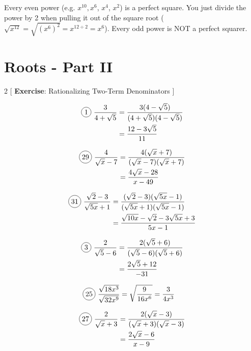 Every even power (e.g. $x^{10}, $$x^{6}$, $x^{4}$, $x^{2}$) is a perfect square. You just divide the power by 2 when pulling it out of the square root ($\sqrt{x^{12}}=\sqrt{(x^{6})^{2}}=x^{12\div 2}=x^{6}$). Every odd power is NOT a perfect squarer.

\section{Roots - Part II}

\begin{multicols}{2}
[
  \textbf{Exercise}: Rationalizing Two-Term Denominators
]

\begin{align*}
  \circled{1}\ \frac{3}{4+\sqrt{5}}&=\frac{3(4-\sqrt{5})}{(4+\sqrt{5})(4-\sqrt{5})}\\
  &=\frac{12-3\sqrt{5}}{11}
\end{align*}

\begin{align*}
  \circled{29}\ \frac{4}{\sqrt{x}-7}&=\frac{4(\sqrt{x}+7)}{(\sqrt{x}-7)(\sqrt{x}+7)}\\
  &=\frac{4\sqrt{x}-28}{x-49}
\end{align*}

\begin{align*}
  \circled{31}\ \frac{\sqrt{2}-3}{\sqrt{5x}+1}&=\frac{(\sqrt{2}-3)(\sqrt{5x}-1)}{(\sqrt{5x}+1)(\sqrt{5x}-1)}\\
  &=\frac{\sqrt{10x}-\sqrt{2}-3\sqrt{5x}+3}{5x-1}
\end{align*}

\begin{align*}
  \circled{3}\ \frac{2}{\sqrt{5}-6}&=\frac{2(\sqrt{5}+6)}{(\sqrt{5}-6)(\sqrt{5}+6)}\\
  &=\frac{2\sqrt{5}+12}{-31}
\end{align*}

\begin{align*}
  \circled{25}\ \frac{\sqrt{18x^{3}}}{\sqrt{32x^{9}}}&=\sqrt{\frac{9}{16x^{6}}}=\frac{3}{4x^{3}}
\end{align*}

\begin{align*}
  \circled{27}\ \frac{2}{\sqrt{x}+3}&=\frac{2(\sqrt{x}-3)}{(\sqrt{x}+3)(\sqrt{x}-3)}\\
  &=\frac{2\sqrt{x}-6}{x-9}
\end{align*}

\end{multicols}

